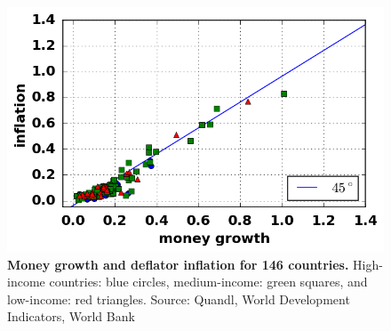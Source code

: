\begin{figure}[h]
\caption{\label{fig_moneyInflationOpen} \textbf{Money growth and deflator inflation for 146 countries.} High-income countries: blue circles, medium-income: green squares, and low-income: red triangles. {\tiny Source: Quandl, World Development Indicators, World Bank}}
\hspace*{-.5cm}\includegraphics[height = 7.cm]{fig_moneyInflationOpen.png}
\end{figure}